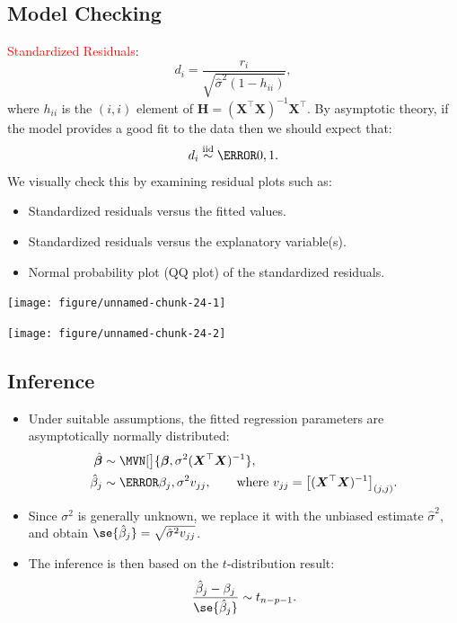 \documentclass{article}\usepackage[]{graphicx}\usepackage[svgnames]{xcolor}
\newenvironment{knitrout}{}{} %
\newcommand*\circled[1]{\tikz[baseline=(char.base)]{\node[shape=circle,draw,inner sep=2pt] (char) {#1};}}
\newcommand{\iid}{\overset{\text{iid}}{\sim}}%
\providecommand{\Vector}[1]{\bm{#1}}%
\providecommand{\Matrix}[1]{\bm{#1}}
\begin{document}
\subsection*{\circled{3} Model Checking}
\textcolor{Red}{Standardized Residuals}:
\[ d_i=\frac{r_i}{\sqrt{\hat{\sigma}^2(1-h_{ii})}},  \]
where $ h_{ii} $ is the $ (i,i) $ element of $ \Matrix{H}=(\Matrix{X}^\top\Matrix{X})^{-1}\Matrix{X}^\top $.
By asymptotic theory, if the model provides a good fit to the data then we
should expect that:
\[ d_i\iid \N{0,1}. \]
We visually check this by examining residual plots such as:
\begin{itemize}
      \item Standardized residuals versus the fitted values.
      \item Standardized residuals versus the explanatory variable(s).
      \item Normal probability plot (QQ plot) of the standardized residuals.
\end{itemize}
\begin{knitrout}
\color{fgcolor}

{\centering \texttt{[image: figure/unnamed-chunk-24-1]} 

}




{\centering \texttt{[image: figure/unnamed-chunk-24-2]} 

}


\end{knitrout}

\subsection*{\circled{4} Inference}
\begin{itemize}
      \item Under suitable assumptions, the fitted regression parameters are asymptotically
            normally distributed:
            \begin{align*}
                  \hat{\Vector{\beta}} & \sim \MVN[\big]{\Vector{\beta},\sigma^2(\Matrix{X}^\top \Matrix{X})^{-1}},                                        \\
                  \hat{\beta}_j        & \sim \N{\beta_j,\sigma^2v_{jj}},\qquad\text{where $v_{jj}=\bigl[(\Matrix{X}^\top\Matrix{X})^{-1}\bigr]_{(j,j)}$}.
            \end{align*}
      \item Since $ \sigma^2 $ is generally unknown, we replace it with the unbiased estimate $ \hat{\sigma}^2 $, and obtain $ \se{\hat{\beta}_j}=\sqrt{\hat{\sigma}^2v_{jj}} $.
      \item The inference is then based on the $t$-distribution result:
            \[ \frac{\hat{\beta}_j-\beta_j}{\se{\hat{\beta}_j}}\sim t_{n-p-1}.  \]
\end{itemize}
\end{document}
